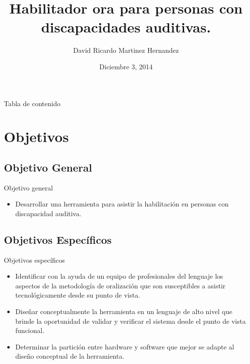 \documentclass[pstricks, 12pt]{beamer}
\title[Habilitador]{Habilitador ora para personas con discapacidades auditivas.}
\author[Martinez, David]{David Ricardo Martinez Hernandez}
\institute[UNAL]{\large Universidad Nacional de Colombia}
\date[12/02/14]{Diciembre 3, 2014}
\begin{document}
\everymath{\displaystyle}
	
\begin{frame}
  \titlepage
\end{frame}

\begin{frame}{Tabla de contenido}
  \tableofcontents
\end{frame}

\section{Objetivos}
\subsection{Objetivo General}
\begin{frame}{Objetivo general}
 \begin{itemize}
  \item Desarrollar una herramienta para asistir la habilitación en personas con discapacidad auditiva.
 \end{itemize}
\end{frame}

\subsection{Objetivos Específicos}
\begin{frame}{Objetivos específicos}
 \begin{itemize}
  \item Identificar con la ayuda de un equipo de profesionales del lenguaje los aspectos de la metodología de oralización que son susceptibles a asistir tecnológicamente desde su punto de vista.
  \item Diseñar conceptualmente la herramienta en un lenguaje de alto nivel que brinde la oportunidad de validar y verificar el sistema desde el punto de vista funcional.
  \item Determinar la partición entre hardware y software que mejor se adapte al diseño conceptual de la herramienta.
 \end{itemize}
\end{frame}
\end{document}
